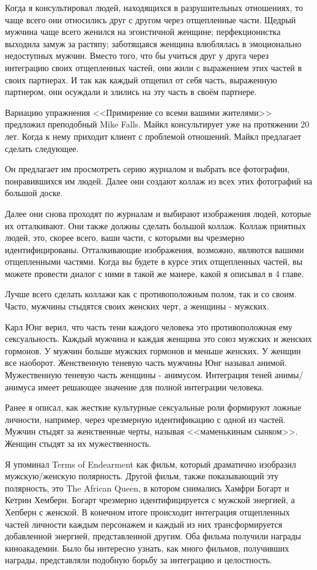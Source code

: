 \documentclass[10pt, fleqn]{article}
\begin{document}
Когда я консультировал людей, находящихся в разрушительных отношениях, то чаще всего они относились друг с другом через отщепленные части. Щедрый мужчина чаще всего женился на эгоистичной женщине; перфекционистка выходила замуж за растяпу; заботящаяся женщина влюблялась в эмоционально недоступных мужчин. Вместо того, что бы учиться друг у друга через интеграцию своих отщепленных частей, они жили с выражением этих частей в своих партнерах. И так как каждый отщепил от себя часть, выраженную партнером, они осуждали и злились на эту часть в своём партнере.



Вариацию упражнения <<Примирение со всеми вашими жителями>> предложил преподобный Mike Falls. Майкл консультирует уже на протяжении 20 лет. Когда к нему приходит клиент с проблемой отношений, Майкл предлагает сделать следующее.

Он предлагает им просмотреть серию журналом и выбрать все фотографии, понравившихся им людей. Далее они создают коллаж из всех этих фотографий на большой доске.

Далее они снова проходят по журналам и выбирают изображения людей, которые их отталкивают. Они также должны сделать большой коллаж. Коллаж приятных людей, это, скорее всего, ваши части, с которыми вы чрезмерно идентифицированы. Отталкивающие изображения, возможно, являются вашими отщепленными частями. Когда вы будете в курсе этих отщепленных частей, вы можете провести диалог с ними в такой же манере, какой я описывал в 4 главе.

Лучше всего сделать коллажи как с противоположным полом, так и со своим. Часто, мужчины стыдятся своих женских черт, а женщины - мужских.

Карл Юнг верил, что часть тени каждого человека это противоположная ему сексуальность. Каждый мужчина и каждая женщина это союз мужских и женских гормонов. У мужчин больше мужских гормонов и меньше женских. У женщин все наоборот. Женственную теневую часть мужчины Юнг называл анимой. Мужественную теневую часть женщины - анимусом. Интеграция теней анимы/анимуса имеет решающее значение для полной интеграции человека.

Ранее я описал, как жесткие культурные сексуальные роли формируют ложные личности, например, через чрезмерную идентификацию с одной из частей. Мужчин стыдят за женственные черты, называя <<маменькиным сынком>>. Женщин стыдят за их мужественность.

Я упоминал Terms of Endearment как фильм, который драматично изобразил мужскую/женскую полярность. Другой фильм, также показывающий эту полярность, это The African Queen, в котором снимались Хамфри Богарт и Кетрин Хемберн. Богарт чрезмерно идентифицируется с мужской энергией, а Хепберн с женской. В конечном итоге происходит интеграция отщепленных частей личности каждым персонажем и каждый из них трансформируется добавленной энергией, представленной другим. Оба фильма получили награды киноакадемии. Было бы интересно узнать, как много фильмов, получивших награды, представляли подобную борьбу за интеграцию и целостность.
\end{document}
